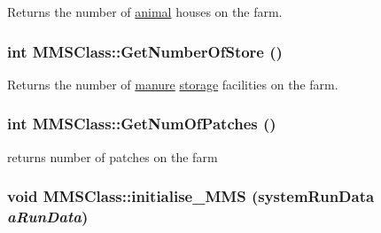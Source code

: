 Returns the number of \hyperlink{classanimal}{animal} houses on the farm. \hypertarget{class_m_m_s_class_a10aa9739fcd0d54b15b3a49bdeca126e}{
\subsubsection[{GetNumberOfStore}]{\setlength{\rightskip}{0pt plus 5cm}int MMSClass::GetNumberOfStore ()}}
\label{class_m_m_s_class_a10aa9739fcd0d54b15b3a49bdeca126e}


Returns the number of \hyperlink{classmanure}{manure} \hyperlink{classstorage}{storage} facilities on the farm. \hypertarget{class_m_m_s_class_a5fbe8cd0e5e37a2770694c63ce042da3}{
\subsubsection[{GetNumOfPatches}]{\setlength{\rightskip}{0pt plus 5cm}int MMSClass::GetNumOfPatches ()}}
\label{class_m_m_s_class_a5fbe8cd0e5e37a2770694c63ce042da3}


returns number of patches on the farm \hypertarget{class_m_m_s_class_abf02bcf9d78d35dddf2867d390f87adb}{
\subsubsection[{initialise\_\-MMS}]{\setlength{\rightskip}{0pt plus 5cm}void MMSClass::initialise\_\-MMS ({\bf systemRunData} {\em aRunData})}}
\label{class_m_m_s_class_abf02bcf9d78d35dddf2867d390f87adb}


